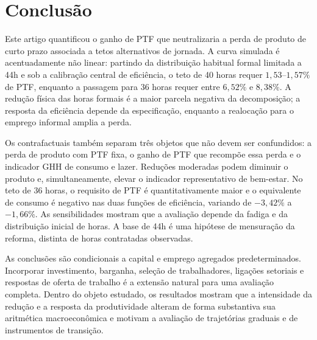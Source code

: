 \section{Conclusão}\label{sec:conclusion}

Este artigo quantificou o ganho de PTF que neutralizaria a perda de produto de curto prazo associada a tetos alternativos de jornada. A curva simulada é acentuadamente não linear: partindo da distribuição habitual formal limitada a 44h e sob a calibração central de eficiência, o teto de 40 horas requer $1{,}53$--$1{,}57\%$ de PTF, enquanto a passagem para 36 horas requer entre $6{,}52\%$ e $8{,}38\%$. A redução física das horas formais é a maior parcela negativa da decomposição; a resposta da eficiência depende da especificação, enquanto a realocação para o emprego informal amplia a perda.

Os contrafactuais também separam três objetos que não devem ser confundidos: a perda de produto com PTF fixa, o ganho de PTF que recompõe essa perda e o indicador GHH de consumo e lazer. Reduções moderadas podem diminuir o produto e, simultaneamente, elevar o indicador representativo de bem-estar. No teto de 36 horas, o requisito de PTF é quantitativamente maior e o equivalente de consumo é negativo nas duas funções de eficiência, variando de $-3{,}42\%$ a $-1{,}66\%$. As sensibilidades mostram que a avaliação depende da fadiga e da distribuição inicial de horas. A base de 44h é uma hipótese de mensuração da reforma, distinta de horas contratadas observadas.

As conclusões são condicionais a capital e emprego agregados predeterminados. Incorporar investimento, barganha, seleção de trabalhadores, ligações setoriais e respostas de oferta de trabalho é a extensão natural para uma avaliação completa. Dentro do objeto estudado, os resultados mostram que a intensidade da redução e a resposta da produtividade alteram de forma substantiva sua aritmética macroeconômica e motivam a avaliação de trajetórias graduais e de instrumentos de transição.

\FloatBarrier

